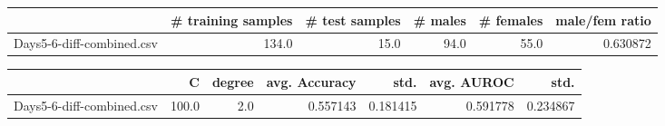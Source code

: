 \begin{tabular}{lrrrrr}
\hline
{} &  \# training samples &  \# test samples &  \# males &  \# females &  male/fem ratio \\
\hline
Days5-6-diff-combined.csv &               134.0 &            15.0 &     94.0 &       55.0 &        0.630872 \\
\hline
\end{tabular}
\begin{tabular}{lrrrrrr}
\hline
{} &      C &  degree &  avg. Accuracy &      std. &  avg. AUROC &      std. \\
\hline
Days5-6-diff-combined.csv &  100.0 &     2.0 &       0.557143 &  0.181415 &    0.591778 &  0.234867 \\
\hline
\end{tabular}
